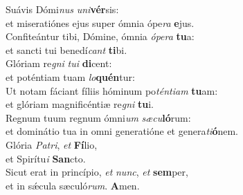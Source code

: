 \evenverse Suávis Dómi\textit{nus} \textit{u}\textit{ni}\textbf{vér}sis:~\*\\
\evenverse et miseratiónes ejus super ómnia ópe\textit{ra} \textbf{e}jus.\\
\oddverse Confiteántur tibi, Dómine, ómnia \textit{ó}\textit{pe}\textit{ra} \textbf{tu}a:~\*\\
\oddverse et sancti tui benedí\textit{cant} \textbf{ti}bi.\\
\evenverse Glóriam re\textit{gni} \textit{tu}\textit{i} \textbf{di}cent:~\*\\
\evenverse et poténtiam tuam \textit{lo}\textbf{quén}tur:\\
\oddverse Ut notam fáciant fíliis hóminum po\textit{tén}\textit{ti}\textit{am} \textbf{tu}am:~\*\\
\oddverse et glóriam magnificéntiæ re\textit{gni} \textbf{tu}i.\\
\evenverse Regnum tuum regnum ómni\textit{um} \textit{sæ}\textit{cu}\textbf{ló}rum:~\*\\
\evenverse et dominátio tua in omni generatióne et genera\textit{ti}\textbf{ó}nem.\\
\oddverse Glória \textit{Pa}\textit{tri}, \textit{et} \textbf{Fí}lio,~\*\\
\oddverse et Spirítu\textit{i} \textbf{San}cto.\\
\evenverse Sicut erat in princípio, \textit{et} \textit{nunc}, \textit{et} \textbf{sem}per,~\*\\
\evenverse et in sǽcula sæculó\textit{rum}. \textbf{A}men.\\
